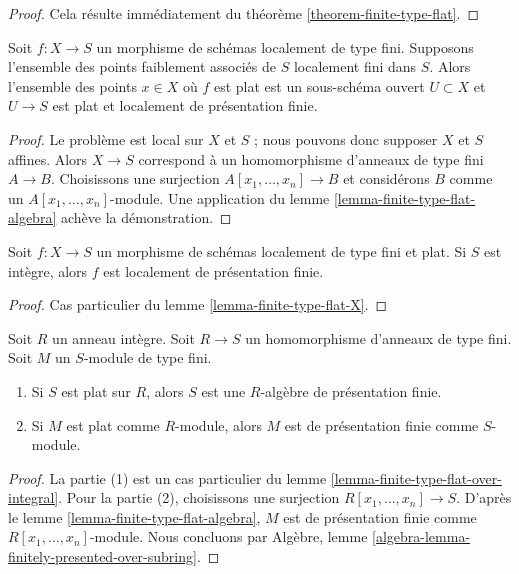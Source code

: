 \begin{proof}
Cela résulte immédiatement du
théorème \ref{theorem-finite-type-flat}.
\end{proof}

\begin{lemma}
\label{lemma-finite-type-flat-X}
Soit $f : X \to S$ un morphisme de schémas localement de type
fini. Supposons l'ensemble des points faiblement associés de $S$ localement fini
dans $S$. Alors l'ensemble des points $x \in X$ où $f$ est plat est un sous-schéma
ouvert $U \subset X$ et $U \to S$ est plat et localement de présentation
finie.
\end{lemma}

\begin{proof}
Le problème est local sur $X$ et $S$ ; nous pouvons donc supposer
$X$ et $S$ affines. Alors $X \to S$ correspond à un homomorphisme d'anneaux
de type fini $A \to B$. Choisissons une surjection $A[x_1, \ldots, x_n] \to B$
et considérons $B$ comme un $A[x_1, \ldots, x_n]$-module. Une application du
lemme \ref{lemma-finite-type-flat-algebra}
achève la démonstration.
\end{proof}

\begin{lemma}
\label{lemma-finite-type-flat-over-integral}
Soit $f : X \to S$ un morphisme de schémas
localement de type fini et plat. Si $S$ est intègre, alors $f$
est localement de présentation finie.
\end{lemma}

\begin{proof}
Cas particulier du
lemme \ref{lemma-finite-type-flat-X}.
\end{proof}

\begin{proposition}
\label{proposition-flat-finite-type-finite-presentation-domain}
Soit $R$ un anneau intègre. Soit $R \to S$ un homomorphisme d'anneaux de type fini.
Soit $M$ un $S$-module de type fini.
\begin{enumerate}
\item Si $S$ est plat sur $R$, alors $S$ est une $R$-algèbre de présentation finie.
\item Si $M$ est plat comme $R$-module, alors $M$ est de présentation finie
comme $S$-module.
\end{enumerate}
\end{proposition}

\begin{proof}
La partie (1) est un cas particulier du
lemme \ref{lemma-finite-type-flat-over-integral}.
Pour la partie (2), choisissons une surjection $R[x_1, \ldots, x_n] \to S$.
D'après le lemme \ref{lemma-finite-type-flat-algebra}, $M$
est de présentation finie comme $R[x_1, \ldots, x_n]$-module.
Nous concluons par Algèbre, lemme
\ref{algebra-lemma-finitely-presented-over-subring}.
\end{proof}

